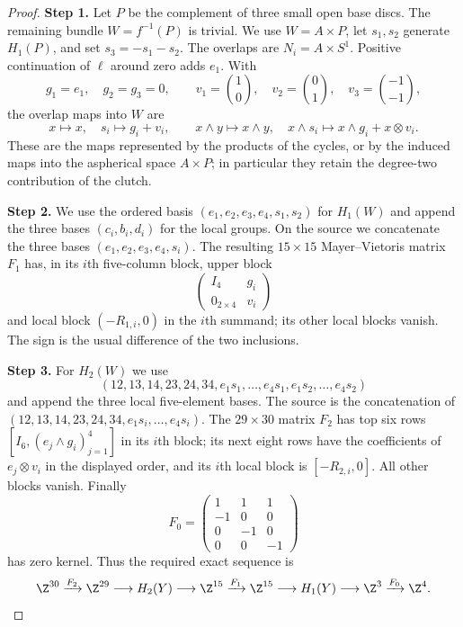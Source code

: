 \begin{proof}
\noindent\textbf{Step 1.} Let $P$ be the complement of three small open base discs. The remaining
bundle $W=f^{-1}(P)$ is trivial. We use $W=A\times P$, let $s_1,s_2$
generate $H_1(P)$, and set $s_3=-s_1-s_2$. The overlaps are
$N_i=A\times S^1$. Positive continuation of $\ell$ around zero adds $e_1$.
With
\[
 g_1=e_1,\quad g_2=g_3=0,\qquad
 v_1=\binom10,\quad v_2=\binom01,\quad v_3=\binom{-1}{-1},
\]
the overlap maps into $W$ are
\[
 x\mapsto x,\quad s_i\mapsto g_i+v_i,\qquad
 x\wedge y\mapsto x\wedge y,\quad
 x\wedge s_i\mapsto x\wedge g_i+x\otimes v_i.
\]
These are the maps represented by the products of the cycles, or by the
induced maps into the aspherical space $A\times P$; in particular they
retain the degree-two contribution of the clutch.

\noindent\textbf{Step 2.} We use the ordered basis $(e_1,e_2,e_3,e_4,s_1,s_2)$ for $H_1(W)$ and
append the three bases $(c_i,b_i,d_i)$ for the local groups. On the source
we concatenate the three bases $(e_1,e_2,e_3,e_4,s_i)$. The resulting
$15\times15$ Mayer--Vietoris matrix $F_1$ has, in its $i$th five-column
block, upper block
\[
 \begin{pmatrix}I_4&g_i\\0_{2\times4}&v_i\end{pmatrix}
\]
and local block $(-R_{1,i},0)$ in the $i$th summand; its other local
blocks vanish. The sign is the usual difference of the two inclusions.

\noindent\textbf{Step 3.} For $H_2(W)$ we use
\[
 (12,13,14,23,24,34,e_1s_1,\ldots,e_4s_1,e_1s_2,\ldots,e_4s_2)
\]
and append the three local five-element bases. The source is the
concatenation of $(12,13,14,23,24,34,e_1s_i,\ldots,e_4s_i)$.
The $29\times30$ matrix $F_2$ has top six rows
$[I_6,(e_j\wedge g_i)_{j=1}^4]$ in its $i$th block; its next eight rows
have the coefficients of $e_j\otimes v_i$ in the displayed order, and
its $i$th local block is $[-R_{2,i},0]$. All other blocks vanish.
Finally
\[
 F_0=\begin{pmatrix}1&1&1\\-1&0&0\\0&-1&0\\0&0&-1\end{pmatrix}
\]
has zero kernel. Thus the required exact sequence is
\[
 \Z^{30}\xrightarrow{F_2}\Z^{29}\longrightarrow H_2(Y)
 \longrightarrow\Z^{15}\xrightarrow{F_1}\Z^{15}\longrightarrow H_1(Y)
 \longrightarrow\Z^3\xrightarrow{F_0}\Z^4.
\]


\end{proof}
